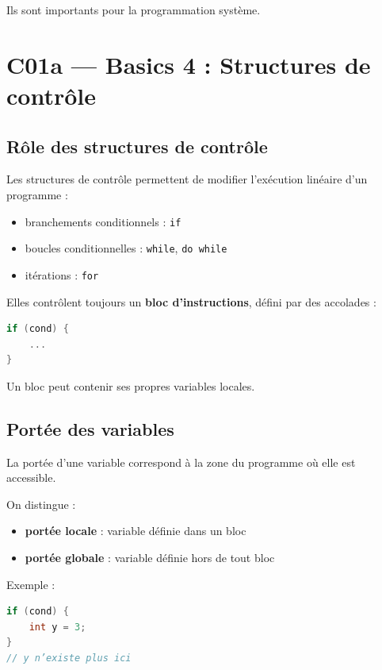 Ils sont importants pour la programmation système.

\section{C01a — Basics 4 : Structures de contrôle}

\subsection{Rôle des structures de contrôle}

Les structures de contrôle permettent de modifier l’exécution linéaire d’un programme :

\begin{itemize}
    \item branchements conditionnels : \texttt{if}
    \item boucles conditionnelles : \texttt{while}, \texttt{do while}
    \item itérations : \texttt{for}
\end{itemize}

Elles contrôlent toujours un \textbf{bloc d’instructions}, défini par des accolades :

\begin{lstlisting}[language=C]
if (cond) {
    ...
}
\end{lstlisting}

Un bloc peut contenir ses propres variables locales.

\subsection{Portée des variables}

La portée d’une variable correspond à la zone du programme où elle est accessible.

On distingue :

\begin{itemize}
    \item \textbf{portée locale} : variable définie dans un bloc
    \item \textbf{portée globale} : variable définie hors de tout bloc
\end{itemize}

Exemple :

\begin{lstlisting}[language=C]
if (cond) {
    int y = 3;
}
// y n’existe plus ici
\end{lstlisting}

